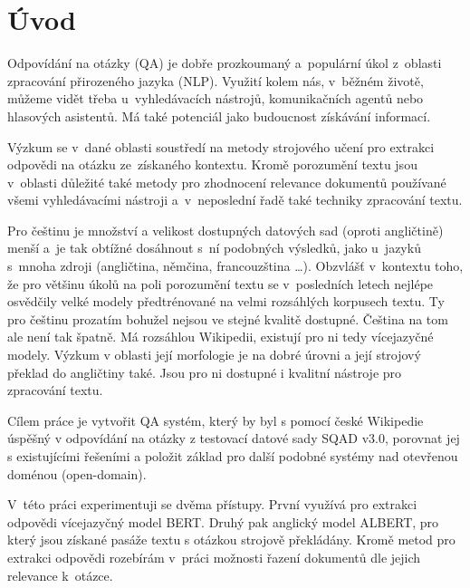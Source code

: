 
\chapter{Úvod}
Odpovídání na otázky (QA) je dobře prozkoumaný a~populární úkol z~oblasti zpracování přirozeného jazyka (NLP). Využití kolem nás, v~běžném životě, můžeme vidět třeba u~vyhledávacích nástrojů, komunikačních agentů nebo hlasových asistentů. Má také potenciál jako budoucnost získávání informací.\par 
Výzkum se v~dané oblasti soustředí na metody strojového učení pro extrakci odpovědi na otázku ze~získaného kontextu. Kromě porozumění textu jsou v~oblasti důležité také metody pro zhodnocení relevance dokumentů používané všemi vyhledávacími nástroji a~v~neposlední řadě také techniky zpracování textu.\par
Pro češtinu je množství a velikost dostupných datových sad (oproti angličtině) menší a~je tak obtížné dosáhnout s~ní podobných výsledků, jako u~jazyků s~mnoha zdroji (angličtina, němčina, francouzština \dots). Obzvlášť v~kontextu toho, že pro většinu úkolů na poli porozumění textu se v~posledních letech nejlépe osvědčily velké modely předtrénované na velmi rozsáhlých korpusech textu. Ty pro češtinu prozatím bohužel nejsou ve stejné kvalitě dostupné. Čeština na tom ale není tak špatně. Má rozsáhlou Wikipedii, existují pro ni tedy vícejazyčné modely. Výzkum v oblasti její morfologie je na dobré úrovni a její strojový překlad do angličtiny také. Jsou pro ni dostupné i kvalitní nástroje pro zpracování textu.\par \smallskip

Cílem práce je vytvořit QA systém, který by byl s pomocí české Wikipedie úspěšný v odpovídání na otázky z testovací datové sady SQAD v3.0, porovnat jej s existujícími řešeními a položit základ pro další podobné systémy nad otevřenou doménou (open-domain).\par \smallskip
V~této práci experimentuji se dvěma přístupy. První využívá pro extrakci odpovědi vícejazyčný model BERT. Druhý pak anglický model ALBERT, pro který jsou získané pasáže textu s otázkou strojově překládány. Kromě metod pro extrakci odpovědi rozebírám  v~práci možnosti řazení dokumentů dle jejich relevance k~otázce.\par

